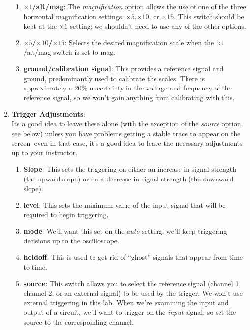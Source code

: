 \begin{enumerate}
\begin{enumerate}
	\item {\bf $\times 1$/alt/mag}: The {\it magnification} option allows 
the use of one of the three horizontal magnification settings, 
$\times 5$,$\times 10$, or $\times 15$. This switch should
be kept at the $\times 1$ setting; we shouldn't need to use any of the other
options.

	\item {\bf $\times 5$/$\times 10$/$\times 15$}:  Selects the desired
magnification scale when the $\times 1$/alt/mag switch is set to mag.

	\item {\bf ground/calibration signal}:  This provides a reference 
signal and ground, predominantly used to calibrate the scales.  There is 
approximately a 20\% uncertainty in the voltage and frequency of the reference 
signal, so we won't gain anything from calibrating with this.
	\end{enumerate}

\item {\bf Trigger Adjustments}: \\

Its a good idea to leave these alone (with the exception of the {\it source}
option, see below) unless you have problems getting a stable trace to appear 
on the screen; even in that case, it's a good idea to leave the necessary 
adjustments up to your instructor.  

	\begin{enumerate}
	\item {\bf Slope}: This sets the triggering on either an increase in 
signal strength (the upward slope) or on a decrease in signal strength (the 
downward slope).

	\item {\bf level}: This sets the minimum value of the input signal that
will be required to begin triggering. 

	\item {\bf mode}: We'll want this set on the {\it auto} setting; we'll
keep triggering decisions up to the oscilloscope.         

	\item {\bf holdoff}: This is used to get rid of ``ghost'' signals that
appear from time to time.

	\item {\bf source}: This switch allows you to select the reference 
signal (channel 1, channel 2, or an external signal) to be used by the 
trigger. We won't use external triggering in this lab.  When we're examining 
the input and output of a circuit, we'll want to trigger on the {\it input} 
signal, so set the source to the corresponding channel.


\end{enumerate}
\end{enumerate}
